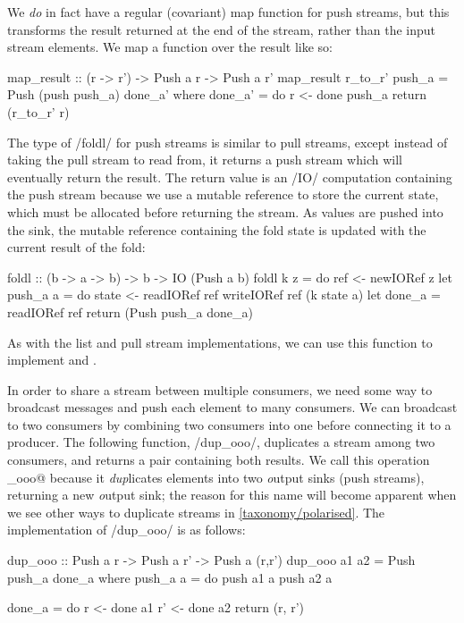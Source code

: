 We \emph{do} in fact have a regular (covariant) map function for push streams, but this transforms the result returned at the end of the stream, rather than the input stream elements.
We map a function over the result like so:

\begin{haskell}
map_result :: (r -> r') -> Push a r -> Push a r'
map_result r_to_r' push_a = Push (push push_a) done_a'
 where
  done_a' = do
    r <- done push_a
    return (r_to_r' r)
\end{haskell}

The type of \Hs/foldl/ for push streams is similar to pull streams, except instead of taking the pull stream to read from, it returns a push stream which will eventually return the result.
The return value is an \Hs/IO/ computation containing the push stream because we use a mutable reference to store the current state, which must be allocated before returning the stream.
As values are pushed into the sink, the mutable reference containing the fold state is updated with the current result of the fold:

\begin{haskell}
foldl :: (b -> a -> b) -> b -> IO (Push a b)
foldl k z = do
  ref <- newIORef z
  let push_a a = do
       state <- readIORef ref
       writeIORef ref (k state a)
  let done_a = readIORef ref
  return (Push push_a done_a)
\end{haskell}

As with the list and pull stream implementations, we can use this \Hs@foldl@ function to implement \Hs@correlation@ and \Hs@regression@.

In order to share a stream between multiple consumers, we need some way to broadcast messages and push each element to many consumers.
We can broadcast to two consumers by combining two consumers into one before connecting it to a producer.
The following function, \Hs/dup_ooo/, duplicates a stream among two consumers, and returns a pair containing both results.
We call this operation \Hs@dup_ooo@ because it \emph{dup}licates elements into two \emph{o}utput sinks (push streams), returning a new \emph{o}utput sink; the reason for this name will become apparent when we see other ways to duplicate streams in \cref{taxonomy/polarised}.
The implementation of \Hs/dup_ooo/ is as follows:

\begin{haskell}
dup_ooo :: Push a r -> Push a r' -> Push a (r,r')
dup_ooo a1 a2 = Push push_a done_a
 where
  push_a a = do
    push a1 a
    push a2 a

  done_a = do
    r  <- done a1
    r' <- done a2
    return (r, r')
\end{haskell}

